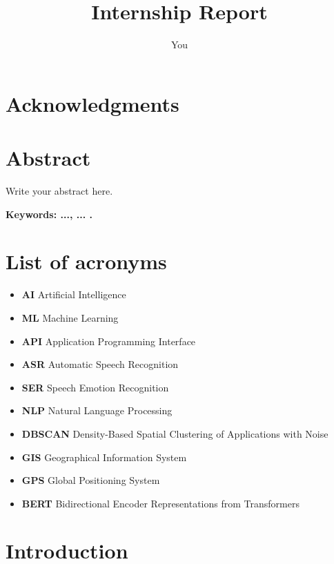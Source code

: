 \documentclass[12pt,a4paper,oneside,english]{book}
\author{You}
\title{Internship Report}
\begin{document}

\chapter*{Acknowledgments}

\frontmatter %
\chapter*{Abstract}
\normalsize{Write your abstract here.

\medskip
{\noindent \textbf{Keywords: ..., ... .} }

\tableofcontents{}
\newpage 
\listoffigures
\newpage 
\listoftables
\newpage
{}
\chapter*{List of acronyms}
\begin{itemize}
\item \textbf{AI} Artificial Intelligence
\item \textbf{ML} Machine Learning
\item \textbf{API} Application Programming Interface
\item \textbf{ASR} Automatic Speech Recognition
\item \textbf{SER} Speech Emotion Recognition
\item  \textbf{NLP} Natural Language Processing
\item \textbf{DBSCAN} Density-Based Spatial Clustering of Applications with Noise
\item \textbf{GIS} Geographical Information System
\item \textbf{GPS} Global Positioning System
\item \textbf{BERT} Bidirectional Encoder Representations from Transformers
\end{itemize}

\frontmatter %

\chapter*{Introduction}

}
\end{document}
